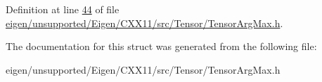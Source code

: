 Definition at line \hyperlink{eigen_2unsupported_2_eigen_2_c_x_x11_2src_2_tensor_2_tensor_arg_max_8h_source_l00044}{44} of file \hyperlink{eigen_2unsupported_2_eigen_2_c_x_x11_2src_2_tensor_2_tensor_arg_max_8h_source}{eigen/unsupported/\+Eigen/\+C\+X\+X11/src/\+Tensor/\+Tensor\+Arg\+Max.\+h}.



The documentation for this struct was generated from the following file\+:\begin{DoxyCompactItemize}
\item 
eigen/unsupported/\+Eigen/\+C\+X\+X11/src/\+Tensor/\+Tensor\+Arg\+Max.\+h\end{DoxyCompactItemize}
